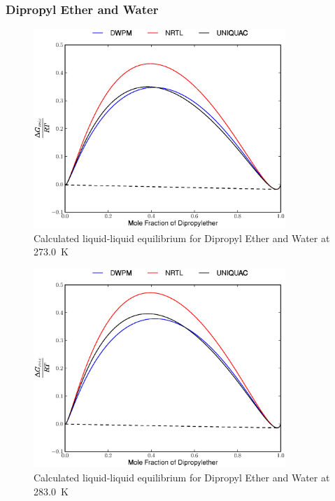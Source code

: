 \subsubsection*{Dipropyl Ether and Water}

\begin{figure}[hp]
\centering
\includegraphics[width = 0.85\textwidth]{Results_Parts/BinaryParams/dipropylether-water/AllModelsGibbsPlots/T_273.eps}
\caption{Calculated liquid-liquid equilibrium for Dipropyl Ether and Water at 273.0~$\mathrm{K}$} 
\end{figure}

\begin{figure}[hp]
\centering
\includegraphics[width = 0.85\textwidth]{Results_Parts/BinaryParams/dipropylether-water/AllModelsGibbsPlots/T_283.eps}
\caption{Calculated liquid-liquid equilibrium for Dipropyl Ether and Water at 283.0~$\mathrm{K}$} 
\end{figure}


